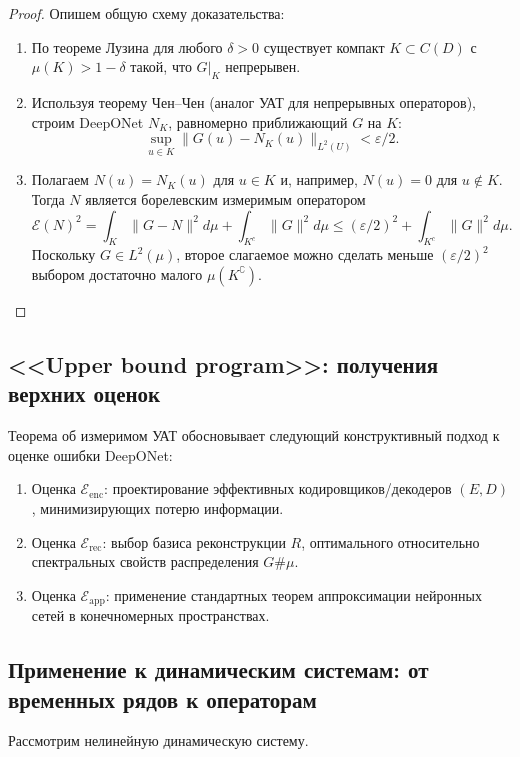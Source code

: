 \documentclass[../NDCNNAI_main.tex]{subfiles}
\begin{document}
\begin{proof}
Опишем общую схему доказательства:
\begin{enumerate}
    \item По теореме Лузина для любого \( \delta > 0 \) существует компакт \( K \subset C(D) \) с \( \mu(K) > 1 - \delta \) такой, что \( G|_K \) непрерывен.
    \item Используя теорему Чен--Чен (аналог УАТ для непрерывных операторов), строим DeepONet \( N_K \), равномерно приближающий \( G \) на \( K \):
    \[
    \sup_{u \in K} \|G(u) - N_K(u)\|_{L^2(U)} < \varepsilon/2.
    \]
    \item Полагаем \( N(u) = N_K(u) \) для \( u \in K \) и, например, \( N(u) = 0 \) для \( u \notin K \). Тогда $N$ является борелевским измеримым оператором
    \[
    \mathcal{E}(N)^2 = \int_K \|G - N\|^2 d\mu + \int_{K^c} \|G\|^2 d\mu \leq (\varepsilon/2)^2 + \int_{K^c} \|G\|^2 d\mu.
    \]
    Поскольку \( G \in L^2(\mu) \), второе слагаемое можно сделать меньше \( (\varepsilon/2)^2 \) выбором достаточно малого \( \mu(K^\complement) \).
\end{enumerate}
\end{proof}

\subsection{<<Upper bound program>>: получения верхних оценок}
Теорема об измеримом УАТ обосновывает следующий конструктивный подход к оценке ошибки DeepONet:
\begin{enumerate}
    \item Оценка \( \mathcal{E}_{\text{enc}} \): проектирование эффективных кодировщиков/декодеров \( (E, D) \), минимизирующих потерю информации.
    \item Оценка \( \mathcal{E}_{\text{rec}} \): выбор базиса реконструкции \( R \), оптимального относительно спектральных свойств распределения \( G\#\mu \).
    \item Оценка \( \mathcal{E}_{\text{app}} \): применение стандартных теорем аппроксимации нейронных сетей в конечномерных пространствах.
\end{enumerate}

\subsection{Применение к динамическим системам: от временных рядов к операторам}

Рассмотрим нелинейную динамическую систему.
\end{document}

